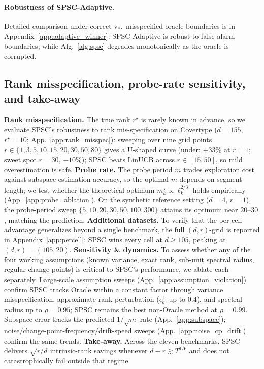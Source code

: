 \documentclass{article}
\begin{document}
\paragraph{Robustness of SPSC-Adaptive.} Detailed comparison under
correct vs.\ misspecified oracle boundaries is in
Appendix~\ref{app:adaptive_winner}: SPSC-Adaptive is robust to
false-alarm boundaries, while Alg.~\ref{alg:spsc} degrades
monotonically as the oracle is corrupted.

\subsection{Rank misspecification, probe-rate sensitivity, and take-away}
\label{sec:exp_sensitivity}

\textbf{Rank misspecification.} The true rank $r^\star$ is rarely
known in advance, so we evaluate SPSC's robustness to rank
mis-specification on Covertype ($d{=}155$, $r^\star{=}10$;
App.~\ref{app:rank_misspec}): sweeping over nine grid points
$r\in\{1,3,5,10,15,20,30,50,80\}$ gives a U-shaped curve (under:
$+33\%$ at $r{=}1$; sweet spot $r{=}30$, $-10\%$); SPSC beats LinUCB
across $r\in[15,50]$, so mild overestimation is safe.
\textbf{Probe rate.} The probe period $m$ trades exploration cost
against subspace-estimation accuracy, so the optimal $m$ depends on
segment length; we test whether the theoretical optimum
$m_k^\star\propto \ell_k^{2/3}$ holds empirically
(App.~\ref{app:probe_ablation}). On the synthetic reference setting
($d{=}4$, $r{=}1$), the probe-period sweep
$\{5,10,20,30,50,100,300\}$ attains its optimum near $20$--$30$,
matching the prediction.
\textbf{Additional datasets.} To verify that the per-cell advantage
generalizes beyond a single benchmark, the full $(d,r)$-grid is
reported in Appendix~\ref{app:percell}: SPSC wins every cell at
$d\ge 105$, peaking at $(d,r){=}(105,20)$.
\textbf{Sensitivity \& dynamics.} To assess whether any of the four
working assumptions (known variance, exact rank, sub-unit spectral
radius, regular change points) is critical to SPSC's performance,
we ablate each separately. Large-scale assumption sweeps
(App.~\ref{app:assumption_violation}) confirm SPSC tracks Oracle
within a constant factor through variance misspecification,
approximate-rank perturbation ($\epsilon_k^\perp$ up to $0.4$), and
spectral radius up to $\rho{=}0.95$; SPSC remains the best non-Oracle
method at $\rho{=}0.99$. Subspace error tracks the predicted
$1/\sqrt m$ rate (App.~\ref{app:subspace});
noise/change-point-frequency/drift-speed sweeps
(App.~\ref{app:noise_cp_drift}) confirm the same trends.
\textbf{Take-away.} Across the eleven benchmarks, SPSC delivers
$\sqrt{r/d}$ intrinsic-rank savings whenever $d-r\gtrsim T^{1/6}$
and does not catastrophically fail outside that regime.
\end{document}

